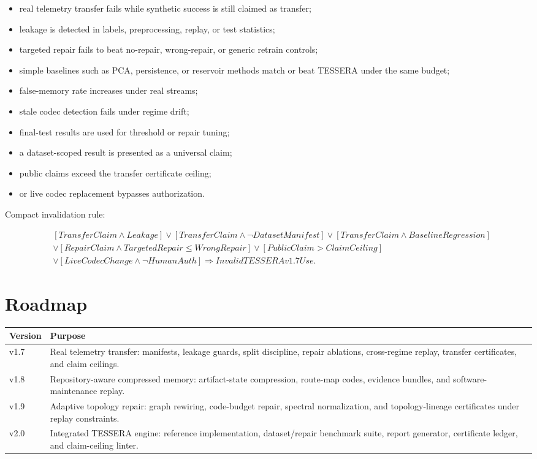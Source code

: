 \documentclass[12pt]{article}
\begin{document}
\begin{itemize}
\item real telemetry transfer fails while synthetic success is still claimed as
transfer;
\item leakage is detected in labels, preprocessing, replay, or test statistics;
\item targeted repair fails to beat no-repair, wrong-repair, or generic retrain
controls;
\item simple baselines such as PCA, persistence, or reservoir methods match or
beat TESSERA under the same budget;
\item false-memory rate increases under real streams;
\item stale codec detection fails under regime drift;
\item final-test results are used for threshold or repair tuning;
\item a dataset-scoped result is presented as a universal claim;
\item public claims exceed the transfer certificate ceiling;
\item or live codec replacement bypasses authorization.
\end{itemize}

Compact invalidation rule:

\[
\begin{aligned}
&[TransferClaim\wedge Leakage]
\vee [TransferClaim\wedge \neg DatasetManifest]
\vee [TransferClaim\wedge BaselineRegression]\\
&\vee [RepairClaim\wedge TargetedRepair\leq WrongRepair]
\vee [PublicClaim>ClaimCeiling]\\
&\vee [LiveCodecChange\wedge \neg HumanAuth]
\Rightarrow InvalidTESSERAv1.7Use.
\end{aligned}
\]

\section{Roadmap}

\begin{longtable}{p{}p{}}
\toprule
\textbf{Version} & \textbf{Purpose} \\
\midrule
v1.7 & Real telemetry transfer: manifests, leakage guards, split discipline,
repair ablations, cross-regime replay, transfer certificates, and claim ceilings. \\
v1.8 & Repository-aware compressed memory: artifact-state compression, route-map
codes, evidence bundles, and software-maintenance replay. \\
v1.9 & Adaptive topology repair: graph rewiring, code-budget repair, spectral
normalization, and topology-lineage certificates under replay constraints. \\
v2.0 & Integrated TESSERA engine: reference implementation, dataset/repair
benchmark suite, report generator, certificate ledger, and claim-ceiling linter. \\
\bottomrule
\end{longtable}
\end{document}
